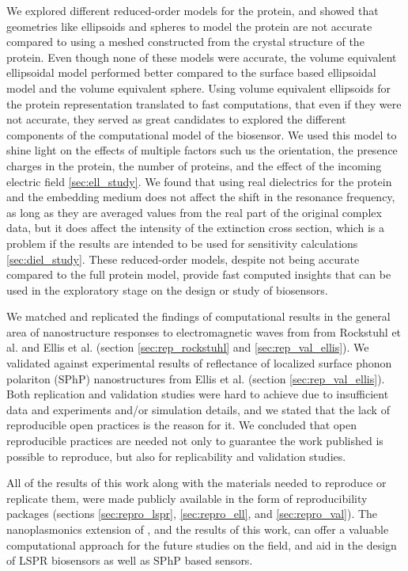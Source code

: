 We explored different reduced-order models for the protein, and showed that geometries like ellipsoids and spheres
to model the protein are not accurate compared to using a meshed constructed from the crystal structure of the protein. Even though
none of these models were accurate, the volume equivalent ellipsoidal model performed better compared to the surface based ellipsoidal 
model and the volume equivalent sphere. Using volume equivalent ellipsoids for the protein representation 
translated to fast computations, that even if they were not accurate, they served as great candidates to explored the different components of the 
computational model of the biosensor. We used this model to shine light on the effects of multiple factors such us 
the orientation, the presence charges in the protein, the number of proteins, and the effect of the incoming electric field \ref{sec:ell_study}.
We found that using real dielectrics for the protein and the embedding medium does not affect the shift in the resonance frequency, 
as long as they are averaged values from the real part of the original complex data, but it does affect the intensity of the extinction 
cross section, which is a problem if the results are intended to be used for sensitivity calculations \ref{sec:diel_study}. 
These reduced-order models, despite not being accurate compared to the full protein model, provide fast computed insights that can be used 
in the exploratory stage on the design or study of biosensors.

We matched and replicated the findings of computational results in the general area of nanostructure responses to electromagnetic waves from 
from Rockstuhl et al. \cite{rockstuhl2005} and Ellis et al.\cite{ellis2016} (section \ref{sec:rep_rockstuhl} and \ref{sec:rep_val_ellis}). We validated \pygbe against experimental results of reflectance 
of localized surface phonon polariton (SPhP) nanostructures from Ellis et al. (section \ref{sec:rep_val_ellis}). Both replication and validation 
studies were hard to achieve due to insufficient data and experiments and/or simulation details, and we stated that the lack of reproducible open
practices is the reason for it. We concluded that open reproducible practices are needed not only to guarantee the work published is possible 
to reproduce, but also for replicability and validation studies. 

All of the results of this work along with the materials needed to reproduce or replicate them, were made publicly available in the form of 
reproducibility packages (sections \ref{sec:repro_lspr}, \ref{sec:repro_ell}, and \ref{sec:repro_val}). The nanoplasmonics extension of \pygbe, and 
the results of this work, can offer a valuable computational approach for the future studies on the field, and aid in the design of LSPR biosensors as well as SPhP based sensors. 


